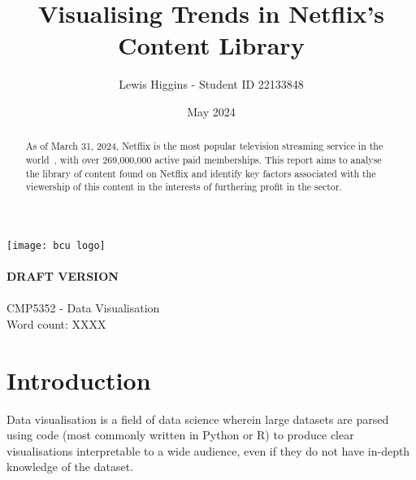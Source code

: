 \documentclass[12pt]{report}\usepackage[]{graphicx}\usepackage[]{xcolor}
\title{Visualising Trends in Netflix's Content Library}
\author{Lewis Higgins - Student ID 22133848}
\date{May 2024}
\begin{document}
 \pagecolor{yellow} %



    \makeatletter
    \begin{titlepage}
        \begin{center}
            \texttt{[image: bcu logo]}\\[7ex]
            {\huge \bfseries  \@title }\\[2ex]
            {\large \bfseries  DRAFT VERSION }\\[30ex]
            {\@author}\\[2ex]
            {CMP5352 - Data Visualisation}\\[10ex]
            {Word count: XXXX}\\[10ex]
        \end{center}
    \end{titlepage}
    \makeatother
    \thispagestyle{empty}
    \newpage

  \pagecolor{white} %

    \begin{abstract}

    As of March 31, 2024, Netflix is the most popular television streaming service
    in the world~\autocite{NetflixSubStats}, with over 269,000,000 active paid memberships. 
    This report aims to analyse the library of content found on Netflix and identify 
    key factors associated with the viewership of this content in the interests of furthering
    profit in the sector.

    \end{abstract} 
    
    \setcounter{page}{0}

    \tableofcontents
    \thispagestyle{empty}

    \chapter*{Introduction}
    
    Data visualisation is a field of data science wherein large datasets are parsed
    using code (most commonly written in Python or R) to produce clear visualisations
    interpretable to a wide audience, even if they do not have in-depth knowledge
    of the dataset. \\
\end{document}
